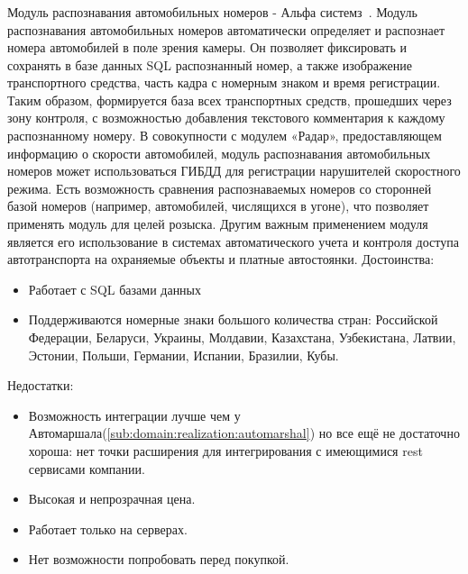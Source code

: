 \subsubsection{}
\label{sub:domain:alpha_systems}
Модуль распознавания автомобильных номеров - Альфа системз~\cite{alpha_system}. Модуль распознавания автомобильных номеров автоматически определяет и распознает номера автомобилей в поле зрения камеры. Он позволяет фиксировать и сохранять в базе данных SQL распознанный номер, а также изображение транспортного средства, часть кадра с номерным знаком и время регистрации. Таким образом, формируется база всех транспортных средств, прошедших через зону контроля, с возможностью добавления текстового комментария к каждому распознанному номеру. В совокупности с модулем «Радар», предоставляющем информацию о скорости автомобилей, модуль распознавания автомобильных номеров может использоваться ГИБДД для регистрации нарушителей скоростного режима. Есть возможность сравнения распознаваемых номеров со сторонней базой номеров (например, автомобилей, числящихся в угоне), что позволяет применять модуль для целей розыска. Другим важным применением модуля является его использование в системах автоматического учета и контроля доступа автотранспорта на охраняемые объекты и платные автостоянки.
Достоинства:
\begin{itemize}
  \item Работает с SQL базами данных
  \item Поддерживаются номерные знаки большого количества стран: Российской Федерации, Беларуси, Украины, Молдавии, Казахстана, Узбекистана, Латвии, Эстонии, Польши, Германии, Испании, Бразилии, Кубы.
\end{itemize}
Недостатки:
\begin{itemize}
  \item Возможность интеграции лучше чем у Автомаршала(\ref{sub:domain:realization:automarshal}) но все ещё не достаточно хороша: нет точки расширения для интегрирования с имеющимися rest сервисами компании.
  \item Высокая и непрозрачная цена.
  \item Работает только на \windows{} серверах.
  \item Нет возможности попробовать перед покупкой.
\end{itemize}

